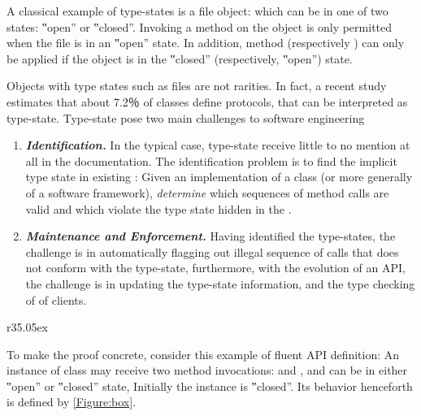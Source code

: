 A classical example of type-states is a file object: which can be in one of two
states: ‟open” or ‟closed”. Invoking a  method on the object is only
permitted when the file is in an ‟open” state. In addition, method 
(respectively ) can only be applied if the object is in the
‟closed” (respectively, ‟open”) state.

Objects with type states such as files are not rarities.
In fact, a recent study~\cite{Beckman:2011} estimates
  that about 7.2％ of \Java classes define protocols, that can be interpreted as type-state.
Type-state pose two main challenges to software engineering
\begin{enumerate}
  \item \emph{\textbf{Identification.}}
    In the typical case, type-state
        receive little to no mention at all in the documentation.
    The identification problem is to find the implicit
    type state in existing \Java: Given an implementation of a class
    (or more generally of a software framework),
    \emph{determine} which sequences of method calls are valid and which violate the
    type state hidden in the \Java.
  \item \emph{\textbf{Maintenance and Enforcement.}}
    Having identified the type-states, the challenge is in automatically flagging out
      illegal sequence of calls that does not conform
      with the type-state, furthermore, with the
      evolution of an API, the challenge is in updating the type-state information,
      and the type checking of \Java of clients.
\end{enumerate}

\cite{can:you:find:how:towrite:recipe:with:care:in:Latex:and:replace:this:citation:with:the:word:recipe}

\begin{wrapfigure}[9]r{35.05ex}
\caption{\label{Figure:box}Fluent API of a box object, defined by a DFA}

  
\end{wrapfigure}

To make the proof concrete, consider this example of fluent API definition:
An instance of class 
may receive two method invocations:  and ,
and can be in either ‟open” or ‟closed” state,
Initially the instance is ‟closed”.
Its behavior henceforth is defined by \cref{Figure:box}.

